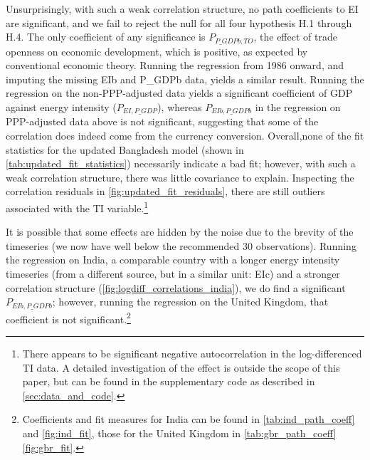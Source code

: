 \documentclass[11pt,a4paper]{article}
\begin{document}
Unsurprisingly, with such a weak correlation structure, no path coefficients to EI are significant, and we fail to reject the null for all four hypothesis H.1 through H.4.
The only coefficient of any significance is $P_{P\_GDPb,TO}$, the effect of trade openness on economic development, which is positive, as expected by conventional economic theory. 
Running the regression from 1986 onward, and imputing the missing EIb and P\_GDPb data, yields a similar result.
Running the regression on the non-PPP-adjusted data yields a significant coefficient of GDP against energy intensity ($P_{EI,P\_GDP}$), whereas $P_{EIb,P\_GDPb}$ in the regression on PPP-adjusted data above is not significant, suggesting that some of the correlation does indeed come from the currency conversion. 
Overall,none of the fit statistics for the updated Bangladesh model (shown in \cref{tab:updated_fit_statistics}) necessarily indicate a bad fit; however, with such a weak correlation structure, there was little covariance to explain. Inspecting the correlation residuals in \cref{fig:updated_fit_residuals}, there are still outliers associated with the TI variable.\footnote{
There appears to be significant negative autocorrelation in the log-differenced TI data. 
A detailed investigation of the effect is outside the scope of this paper, but can be found in the supplementary code as described in \cref{sec:data_and_code}.
}

It is possible that some effects are hidden by the noise due to the brevity of the timeseries (we now have well below the recommended 30 observations). 
Running the regression on India, a comparable country with a longer energy intensity timeseries (from a different source, but in a similar unit: EIc) and a stronger correlation structure (\cref{fig:logdiff_correlations_india}), we do find a significant $P_{EIb,P\_GDPb}$; however, running the regression on the United Kingdom, that coefficient is not significant.\footnote{
Coefficients and fit measures for India can be found in \cref{tab:ind_path_coeff} and \cref{fig:ind_fit},
those for the United Kingdom in \cref{tab:gbr_path_coeff} \cref{fig:gbr_fit}.
} 
\end{document}
